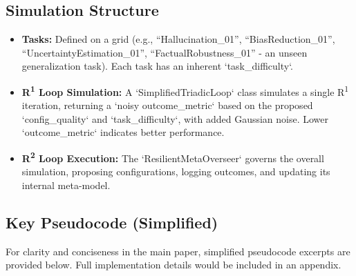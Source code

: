 \documentclass{article}
\begin{document}
\subsection{Simulation Structure}
\begin{itemize}
    \item \textbf{Tasks:} Defined on a grid (e.g., “Hallucination\_01”, “BiasReduction\_01”, “UncertaintyEstimation\_01”, “FactualRobustness\_01” - an unseen generalization task). Each task has an inherent `task_difficulty`.
    \item \textbf{R\textsuperscript{1} Loop Simulation:} A `SimplifiedTriadicLoop` class simulates a single R\textsuperscript{1} iteration, returning a `noisy outcome_metric` based on the proposed `config_quality` and `task_difficulty`, with added Gaussian noise. Lower `outcome_metric` indicates better performance.
    \item \textbf{R\textsuperscript{2} Loop Execution:} The `ResilientMetaOverseer` governs the overall simulation, proposing configurations, logging outcomes, and updating its internal meta-model.
\end{itemize}

\subsection{Key Pseudocode (Simplified)}
For clarity and conciseness in the main paper, simplified pseudocode excerpts are provided below. Full implementation details would be included in an appendix.
\end{document}
